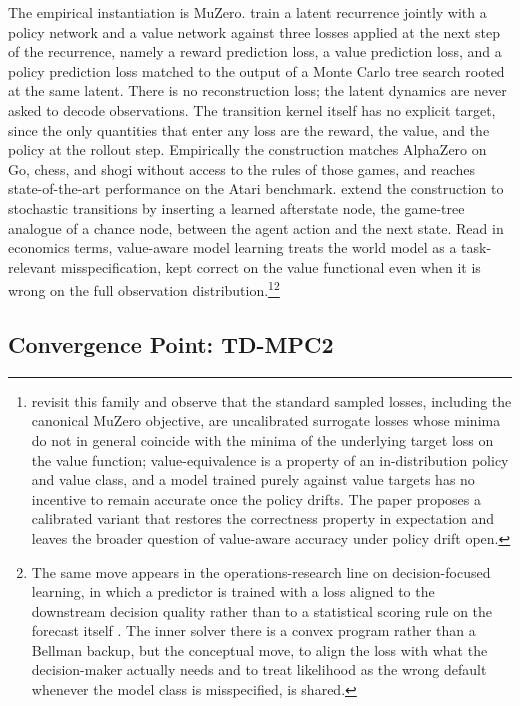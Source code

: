 The empirical instantiation is MuZero. \citet{Schrittwieser2020MuZero} train a latent recurrence jointly with a policy network and a value network against three losses applied at the next step of the recurrence, namely a reward prediction loss, a value prediction loss, and a policy prediction loss matched to the output of a Monte Carlo tree search rooted at the same latent. There is no reconstruction loss; the latent dynamics are never asked to decode observations. The transition kernel itself has no explicit target, since the only quantities that enter any loss are the reward, the value, and the policy at the rollout step. Empirically the construction matches AlphaZero on Go, chess, and shogi without access to the rules of those games, and reaches state-of-the-art performance on the Atari benchmark. \citet{Antonoglou2022StochMuZero} extend the construction to stochastic transitions by inserting a learned afterstate node, the game-tree analogue of a chance node, between the agent action and the next state. Read in economics terms, value-aware model learning treats the world model as a task-relevant misspecification, kept correct on the value functional even when it is wrong on the full observation distribution.\footnote{\citet{VoelckerCalib2025} revisit this family and observe that the standard sampled losses, including the canonical MuZero objective, are uncalibrated surrogate losses whose minima do not in general coincide with the minima of the underlying target loss on the value function; value-equivalence is a property of an in-distribution policy and value class, and a model trained purely against value targets has no incentive to remain accurate once the policy drifts. The paper proposes a calibrated variant that restores the correctness property in expectation and leaves the broader question of value-aware accuracy under policy drift open.}\footnote{The same move appears in the operations-research line on decision-focused learning, in which a predictor is trained with a loss aligned to the downstream decision quality rather than to a statistical scoring rule on the forecast itself \citep{DontiAmosKolter2017}. The inner solver there is a convex program rather than a Bellman backup, but the conceptual move, to align the loss with what the decision-maker actually needs and to treat likelihood as the wrong default whenever the model class is misspecified, is shared.}

\subsection{Convergence Point: TD-MPC2}
\label{section:fc_tdmpc2}

